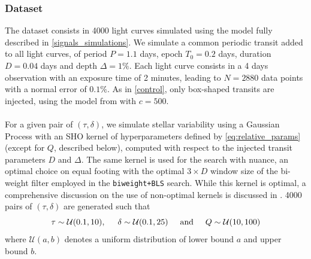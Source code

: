 \documentclass[modern]{aastex631}
\newcommand{\wtls}{\texttt{biweight+BLS}}
\begin{document}
\subsubsection*{Dataset}\label{sim_dataset}
The dataset consists in 4000 light curves simulated using the model fully described in \autoref{signals_simulations}. We simulate a common periodic transit added to all light curves, of period $P=1.1$ days, epoch $T_0=0.2$ days, duration $D=0.04$ days and depth $\Delta=1\%$. Each light curve consists in a 4 days observation with an exposure time of 2 minutes, leading to $N=2880$ data points with a normal error of $0.1\%$. As in \autoref{control}, only box-shaped transits are injected, using the model from \cite{protopapas} with $c=500$.
\\\\
For a given pair of $(\tau, \delta)$, we simulate stellar variability using a Gaussian Process with an SHO kernel of hyperparameters defined by \autoref{eq:relative_params} (except for $Q$, described below), computed with respect to the injected transit parameters $D$ and $\Delta$. The same kernel is used for the search with \textsf{nuance}, an optimal choice on equal footing with the optimal $3\times D$ window size of the bi-weight filter employed in the \wtls{} search. While this kernel is optimal, a comprehensive discussion on the use of non-optimal kernels is discussed in . 4000 pairs of $(\tau, \delta)$ are generated such that
\begin{equation*}
    \tau \sim \mathcal{U}(0.1, 10), \hspace{0.5cm} \delta \sim \mathcal{U}(0.1, 25) \hspace{0.5cm}\text{and}\hspace{0.5cm} Q \sim \mathcal{U}(10, 100)
\end{equation*}
where $\mathcal{U}(a, b)$ denotes a uniform distribution of lower bound $a$ and upper bound $b$.
\end{document}
